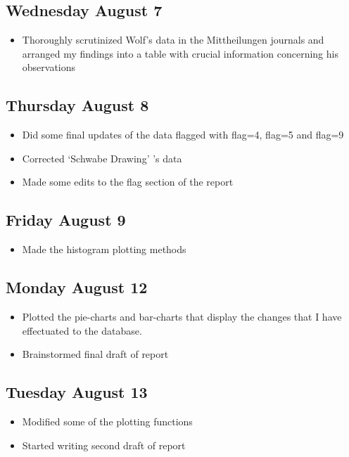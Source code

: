 \documentclass[12pt]{article}
\begin{document}
\subsection{Wednesday August 7}
\begin{itemize}
    \item Thoroughly scrutinized Wolf's data in the Mittheilungen journals and arranged my findings into a table with crucial information concerning his observations
\end{itemize}

\subsection{Thursday August 8}
\begin{itemize}
    \item Did some final updates of the data flagged with flag=4, flag=5 and flag=9
    \item Corrected `Schwabe Drawing' 's data
    \item Made some edits to the flag section of the report
\end{itemize}

\subsection{Friday August 9}
\begin{itemize}
    \item Made the histogram plotting methods
\end{itemize}

\subsection{Monday August 12}
\begin{itemize}
    \item Plotted the pie-charts and bar-charts that display the changes that I have effectuated to the database.
    \item Brainstormed final draft of report
\end{itemize}

\subsection{Tuesday August 13}
\begin{itemize}
    \item Modified some of the plotting functions
    \item Started writing second draft of report
\end{itemize}
\end{document}
